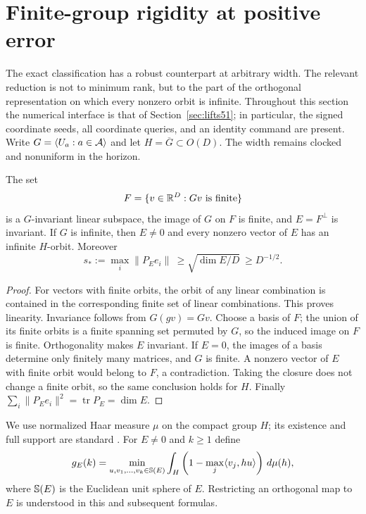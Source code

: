 \section{Finite-group rigidity at positive error}\label{sec:noisy52}
The exact classification has a robust counterpart at arbitrary width.
The relevant reduction is not to minimum rank, but to the part of the
orthogonal representation on which every nonzero orbit is infinite.
Throughout this section the numerical interface is that of
Section~\ref{sec:lifts51}; in particular, the signed coordinate seeds,
all coordinate queries, and an identity command are present. Write
$G=\langle U_a:a\in\mathcal A\rangle$ and let $H=\overline G\subset O(D)$.
The width remains clocked and nonuniform in the horizon.

\begin{lemma}\label{lem:finite-orbit52}
The set
\[
 F=\{v\in\mathbb R^D: Gv\text{ is finite}\}
\]
is a $G$-invariant linear subspace, the image of $G$ on $F$ is finite,
and $E=F^\perp$ is invariant. If $G$ is infinite, then $E\ne0$ and
every nonzero vector of $E$ has an infinite $H$-orbit. Moreover
\begin{equation}\label{eq:seed-moving52}
 s_*:=\max_i\|P_Ee_i\|\ \ge\sqrt{\dim E/D}\ \ge D^{-1/2}.
\end{equation}
\end{lemma}
\begin{proof}
For vectors with finite orbits, the orbit of any linear combination
is contained in the corresponding finite set of linear combinations.
This proves linearity. Invariance follows from $G(gv)=Gv$. Choose a
basis of $F$; the union of its finite orbits is a finite spanning set
permuted by $G$, so the induced image on $F$ is finite. Orthogonality
makes $E$ invariant. If $E=0$, the images of a basis determine only
finitely many matrices, and $G$ is finite. A nonzero vector of $E$
with finite orbit would belong to $F$, a contradiction. Taking the
closure does not change a finite orbit, so the same conclusion holds
for $H$. Finally $\sum_i\|P_Ee_i\|^2=\operatorname{tr}P_E=\dim E$.
\end{proof}

We use normalized Haar measure $\mu$ on the compact group $H$; its
existence and full support are standard \cite{Folland16}. For $E\ne0$
and $k\ge1$ define
\begin{equation}\label{eq:haar-gap52}
 g_E(k)=\min_{u,v_1,\ldots,v_k\in\mathbb S(E)}
 \int_H\left(1-\max_j\langle v_j,hu\rangle\right)\,d\mu(h),
\end{equation}
where $\mathbb S(E)$ is the Euclidean unit sphere of $E$. Restricting
an orthogonal map to $E$ is understood in this and subsequent formulas.


